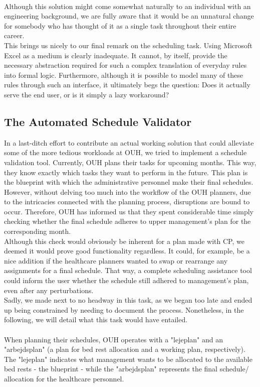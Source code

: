 \\
Although this solution might come somewhat naturally to an individual with an engineering background, we are fully aware that it would be an unnatural change for somebody who has thought of it as a single task throughout their entire career.
\\
This brings us nicely to our final remark on the scheduling task. Using Microsoft Excel as a medium is clearly inadequate. It cannot, by itself, provide the necessary abstraction required for such a complex translation of everyday rules into formal logic. Furthermore, although it is possible to model many of these rules through such an interface, it ultimately begs the question: Does it actually serve the end user, or is it simply a lazy workaround?

\subsection{The Automated Schedule Validator}
In a last-ditch effort to contribute an actual working solution that could alleviate some of the more tedious workloads at OUH, we tried to implement a schedule validation tool. Currently, OUH plans their tasks for upcoming months. This way, they know exactly which tasks they want to perform in the future. This plan is the blueprint with which the administrative personnel make their final schedules. However, without delving too much into the workflow of the OUH planners, due to the intricacies connected with the planning process, disruptions are bound to occur. Therefore, OUH has informed us that they spent considerable time simply checking whether the final schedule adheres to upper management's plan for the corresponding month. 
\\
Although this check would obviously be inherent for a plan made with CP, we deemed it would prove good functionality regardless. It could, for example, be a nice addition if the healthcare planners wanted to swap or rearrange any assignments for a final schedule. That way, a complete scheduling assistance tool could inform the user whether the schedule still adhered to management's plan, even after any perturbations.
\\
Sadly, we made next to no headway in this task, as we began too late and ended up being constrained by needing to document the process. Nonetheless, in the following, we will detail what this task would have entailed. 
\\
\\
When planning their schedules, OUH operates with a "lejeplan" and an "arbejdsplan" (a plan for bed rest allocation and a working plan, respectively). The "lejeplan" indicates what management wants to be allocated to the available bed rests - the blueprint - while the "arbejdsplan" represents the final schedule/ allocation for the healthcare personnel. 
